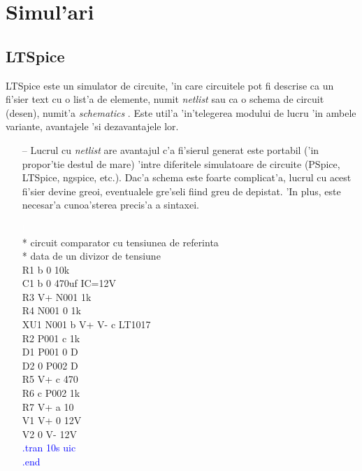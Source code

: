 \section{Simul'ari}
\label{sec:ltspice}
\subsection*{LTSpice}


LTSpice este un simulator de circuite, 'in care circuitele pot fi descrise ca un fi'sier text cu o list'a de elemente, numit \textit{netlist} sau ca o schema de circuit (desen), numit'a \textit{schematics} \cite{ltspice}. Este util'a 'in'telegerea modului de lucru 'in ambele variante, avantajele 'si dezavantajele lor.

 \begin{itemize}
 \item[--] Lucrul cu \textit{netlist} are avantajul c'a fi'sierul generat este portabil ('in propor'tie destul de mare) 'intre diferitele simulatoare de circuite (PSpice, LTSpice, ngspice, etc.). Dac'a schema este foarte complicat'a, lucrul cu acest fi'sier devine greoi, eventualele gre'seli fiind greu de depistat. 'In plus, este necesar'a cunoa'sterea precis'a a sintaxei. 
 \begin{example}
\textcolor{white}{!}\\
\textcolor{OliveGreen}{* circuit comparator cu tensiunea de referinta}\\
\textcolor{OliveGreen}{* data de un divizor de tensiune}\\
R1 b 0 10k \\
C1 b 0 470uf IC=12V \\
R3 V+ N001 1k \\
R4 N001 0 1k \\
XU1 N001 b V+ V- c LT1017 \\
R2 P001 c 1k \\
D1 P001 0 D \\
D2 0 P002 D \\
R5 V+ c 470 \\
R6 c P002 1k \\
R7 V+ a 10\\
V1 V+ 0 12V\\ 
V2 0 V- 12V \\
\textcolor{blue}{.tran 10s uic} \\
\textcolor{blue}{.end}\\
\end{example} 


\end{itemize}
